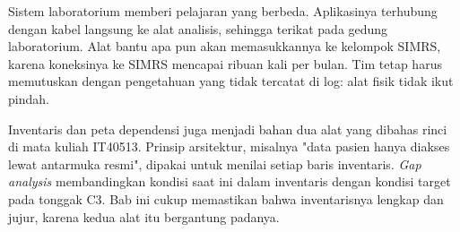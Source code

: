 Sistem laboratorium memberi pelajaran yang berbeda. Aplikasinya terhubung dengan kabel
langsung ke alat analisis, sehingga terikat pada gedung laboratorium. Alat bantu apa pun
akan memasukkannya ke kelompok SIMRS, karena koneksinya ke SIMRS mencapai ribuan kali per bulan. Tim tetap
harus memutuskan dengan pengetahuan yang tidak tercatat di log: alat fisik tidak ikut
pindah.

Inventaris dan peta dependensi juga menjadi bahan dua alat yang dibahas rinci di mata
kuliah IT40513. Prinsip arsitektur, misalnya "data pasien hanya diakses lewat antarmuka
resmi", dipakai untuk menilai setiap baris inventaris. \textit{Gap analysis} membandingkan
kondisi saat ini dalam inventaris dengan kondisi target pada tonggak C3. Bab ini cukup
memastikan bahwa inventarisnya lengkap dan jujur, karena kedua alat itu bergantung padanya.

